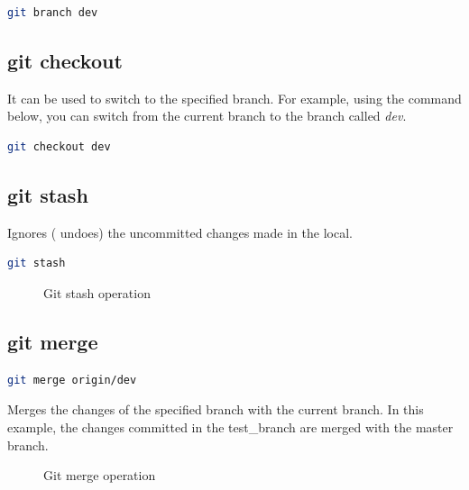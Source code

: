\documentclass[letterpaper]{article}
\begin{document}
\begin{lstlisting}[language=Bash]
git branch dev
\end{lstlisting}

\subsection{git checkout}
It can be used to switch to the specified branch. For example, using the command below, you can switch from the current branch to the branch called \textit{dev}.

\begin{lstlisting}[language=Bash]
git checkout dev
\end{lstlisting}

\subsection{git stash}
Ignores ( undoes) the uncommitted changes made in the local.
\begin{lstlisting}[language=Bash]
git stash
\end{lstlisting}

\begin{figure}[h]
    \centering
    \caption{Git stash operation}
  \end{figure}

\subsection{git merge}
\begin{lstlisting}[language=Bash]
git merge origin/dev
\end{lstlisting}
Merges the changes of the specified branch with the current branch. In this example, the changes committed in the test\_branch are merged with the master branch. 

\begin{figure}[h]
    \centering
    \caption{Git merge operation}
  \end{figure}
\end{document}
